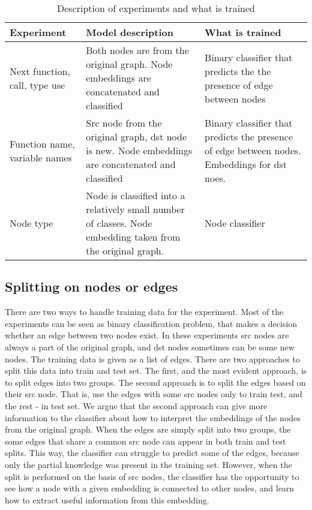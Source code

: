 \documentclass[a4paper,twoside]{article}
\begin{document}
\begin{table*}[H]
    \centering
    \caption{Description of experiments and what is trained \label{tbl:experiment_desc}}
    \begin{tabular}{|p{3cm}|p{6cm}|p{6cm}|}
    \hline
        \textbf{Experiment} & \textbf{Model description} & \textbf{What is trained} \\ \hline
        Next function, call, type use & Both nodes are from the original graph. Node embeddings are concatenated and classified & Binary classifier that predicts the the presence of edge between nodes \\ \hline
        Function name, variable names & Src node from the original graph, dst node is new. Node embeddings are concatenated and classified & Binary classifier that predicts the presence of edge between nodes. Embeddings for dst noes. \\ \hline
        Node type & Node is classified into a relatively small number of classes. Node embedding taken from the original graph. & Node classifier \\ \hline
    \end{tabular}
\end{table*}

\subsection{Splitting on nodes or edges}

There are two ways to handle training data for the experiment. Most of the experiments can be seen as binary classification problem, that makes a decision whether an edge between two nodes exist. In these experiments src nodes are always a part of the original graph, and dst nodes sometimes can be some new nodes. The training data is given as a list of edges. There are two approaches to split this data into train and test set. The first, and the most evident approach, is to split edges into two groups. The second approach is to split the edges based on their src node. That is, use the edges with some src nodes only to train test, and the rest - in test set. 
We argue that the second approach can give more information to the classifier about how to interpret the embeddings of the nodes from the original graph. When the edges are simply split into two groups, the some edges that share a common src node can appear in both train and test splits. This way, the classifier can struggle to predict some of the edges, because only the partial knowledge was present in the training set. However, when the split is performed on the basis of src nodes, the classifier has the opportunity to see how a node with a given embedding is connected to other nodes, and learn how to extract useful information from this embedding. 
\end{document}
